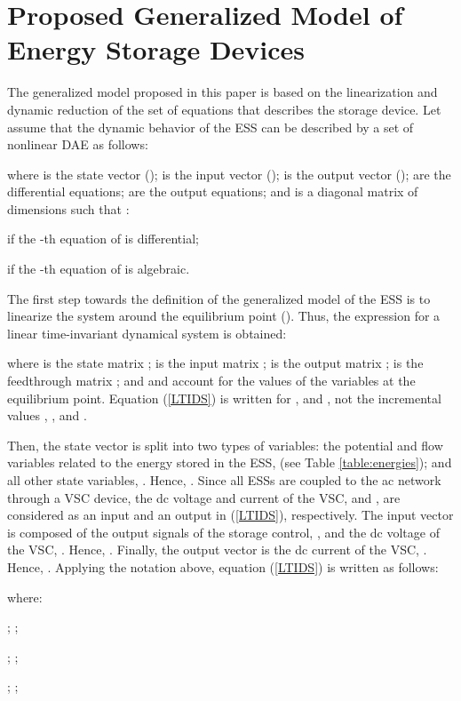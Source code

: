 \documentclass[journal, a4paper]{IEEEtran}
\begin{document}
\section{Proposed Generalized Model of Energy Storage Devices}
\label{sec:genmodel}

The generalized model proposed in this paper is based on the
linearization and dynamic reduction of the set of equations that
describes the storage device.  Let assume that the dynamic behavior of
the ESS can be described by a set of nonlinear DAE as
follows:

where  is the state vector ();  is the input vector
();  is
the output vector ();
 are
the differential equations;  are the output equations; and
 is a diagonal matrix of dimensions 
such that \cite{fabozzi:14}:
\begin{list}{}{}
\item  if the -th equation of
   is differential;
\item  if the -th equation of
   is algebraic.
\end{list}	

The first step towards the definition of the generalized model of the
ESS is to linearize the system around the equilibrium point
(). Thus, the expression for a linear time-invariant
dynamical system is obtained:

where  is the state matrix ;  is the input matrix ;  is the output
matrix ;
 is the feedthrough matrix ; and  and
 account for the values of the
variables at the equilibrium point.  Equation (\ref{LTIDS}) is written
for ,  and , not the incremental
values , , and .

Then, the state vector  is split into two types of
variables: the potential and flow variables related to the energy
stored in the ESS,  (see Table \ref{table:energies}); and all
other state variables, .  Hence, .  Since all ESSs are coupled to the ac network
through a VSC device, the dc voltage and current of the VSC,  and , are considered as an input and an output in
(\ref{LTIDS}), respectively.  The input vector  is composed
of the output signals of the storage control, , and the dc voltage
of the VSC, .  Hence, .  Finally, the output vector  is the dc
current of the VSC, .  Hence, .  Applying the notation above, equation (\ref{LTIDS}) is
written as follows:

where:
\begin{list}{}{}
\item  ;
  \; ; \vspace*{2mm} \item
   ; \;
   ; \vspace*{2mm} \item
   ; \;  ; \; 
\end{list}	
\end{document}
